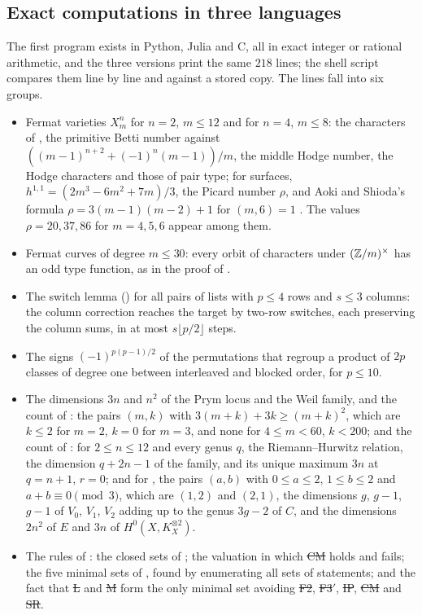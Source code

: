 \subsection*{Exact computations in three languages}
The first program exists in Python, Julia and C, all in exact integer or
rational arithmetic, and the three versions print the same
$218$ lines; the shell script compares them line by line and against a
stored copy. The lines fall into six groups.
\begin{itemize}[leftmargin=2.3em]
\item[F] Fermat varieties $X^{n}_{m}$ for $n=2$, $m\le12$ and for $n=4$,
$m\le8$: the characters of , the primitive Betti
number against $((m-1)^{n+2}+(-1)^{n}(m-1))/m$, the middle Hodge number, the
Hodge characters and those of pair type; for surfaces,
$h^{1,1}=(2m^{3}-6m^{2}+7m)/3$, the Picard number $\rho$, and Aoki and
Shioda's formula $\rho=3(m-1)(m-2)+1$ for $(m,6)=1$ \cite{AS83}. The values
$\rho=20,37,86$ for $m=4,5,6$ appear among them.
\item[J] Fermat curves of degree $m\le30$: every orbit of characters under
$(\mathbb{Z}/m)^{\times}$ has an odd type function, as in the proof of
.
\item[S] The switch lemma () for all pairs of lists with
$p\le4$ rows and $s\le3$ columns: the column correction reaches the target
by two-row switches, each preserving the column sums, in at most
$s\lfloor p/2\rfloor$ steps.
\item[G] The signs $(-1)^{p(p-1)/2}$ of the permutations that regroup a
product of $2p$ classes of degree one between interleaved and blocked
order, for $p\le10$.
\item[W] The dimensions $3n$ and $n^{2}$ of the Prym locus and the Weil
family, and the count of : the pairs $(m,k)$ with
$3(m+k)+3k\ge(m+k)^{2}$, which are $k\le2$ for $m=2$, $k=0$ for $m=3$, and
none for $4\le m<60$, $k<200$; and the count of : for
$2\le n\le12$ and every genus $q$, the Riemann--Hurwitz relation, the
dimension $q+2n-1$ of the family, and its unique maximum $3n$ at $q=n+1$,
$r=0$; and for , the pairs $(a,b)$ with $0\le a\le2$,
$1\le b\le2$ and $a+b\equiv0\pmod3$, which are $(1,2)$ and $(2,1)$, the
dimensions $g$, $g-1$, $g-1$ of $V_{0}$, $V_{1}$, $V_{2}$ adding up to the
genus $3g-2$ of $C$, and the dimensions $2n^{2}$ of $E$ and $3n$ of
$H^{0}(X,K_{X}^{\otimes2})$.
\item[L] The rules of : the closed sets of
; the valuation in which \st{CM} holds and \HC{}
fails; the five minimal sets of , found by enumerating all sets
of statements; and the fact that \st{L} and \st{M} form the only minimal
set avoiding \st{F2}, \st{F3$'$}, \st{IP}, \st{CM} and \st{SR}.
\end{itemize}

